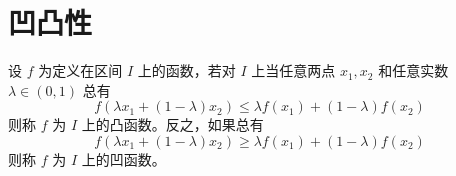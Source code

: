 \section{凹凸性}

\begin{definition}
    设 $f$ 为定义在区间 $I$ 上的函数，若对 $I$ 上当任意两点 $x_1,x_2$ 和任意实数 $\lambda\in (0,1)$ 总有
    $$f(\lambda x_1+(1-\lambda)x_2) \leqslant \lambda f(x_1)+(1-\lambda)f(x_2)$$
    则称 $f$ 为 $I$ 上的凸函数。反之，如果总有
    $$f(\lambda x_1+(1-\lambda)x_2) \geqslant \lambda f(x_1)+(1-\lambda)f(x_2)$$
    则称 $f$ 为 $I$ 上的凹函数。
\end{definition}

